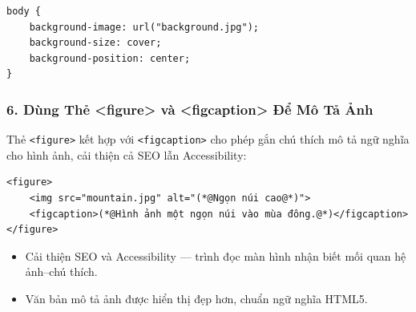 \documentclass[11pt,oneside]{book}
\newcommand{\thd}[1]{\textcolor{white}{\textbf{\strut #1}}}
\newcommand{\codeinline}[1]{\textcolor{accentOrange}{\texttt{#1}}}
\begin{document}
\begin{codeWindow}
\begin{lstlisting}[language=HTML5]
body {
    background-image: url("background.jpg");
    background-size: cover;
    background-position: center;
}
\end{lstlisting}
\end{codeWindow}

\begin{prettyTableBox}
\end{prettyTableBox}

\subsubsection{6. Dùng Thẻ <figure> và <figcaption> Để Mô Tả Ảnh}

Thẻ \codeinline{<figure>} kết hợp với \codeinline{<figcaption>} cho phép gắn chú thích mô tả ngữ nghĩa cho hình ảnh, cải thiện cả SEO lẫn Accessibility:

\begin{codeWindow}
\begin{lstlisting}[language=HTML5]
<figure>
    <img src="mountain.jpg" alt="(*@Ngọn núi cao@*)">
    <figcaption>(*@Hình ảnh một ngọn núi vào mùa đông.@*)</figcaption>
</figure>
\end{lstlisting}
\end{codeWindow}

\begin{tipBox}
\begin{itemize}[leftmargin=1.5em, itemsep=2pt, parsep=0pt]
    \item Cải thiện SEO và Accessibility — trình đọc màn hình nhận biết mối quan hệ ảnh–chú thích.
    \item Văn bản mô tả ảnh được hiển thị đẹp hơn, chuẩn ngữ nghĩa HTML5.
\end{itemize}
\end{tipBox}
\end{document}

